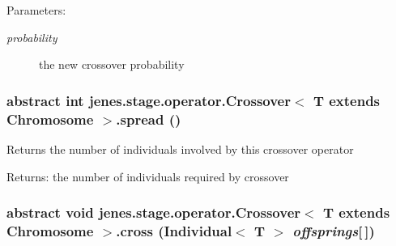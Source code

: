 \begin{Desc}
\item[Parameters:]
\begin{description}
\item[{\em probability}]the new crossover probability \end{description}
\end{Desc}
\hypertarget{classjenes_1_1stage_1_1operator_1_1_crossover_3_01_t_01extends_01_chromosome_01_4_8bb995f2cf77073b79c9276ee3e8535d}{
\subsubsection[spread]{\setlength{\rightskip}{0pt plus 5cm}abstract int jenes.stage.operator.Crossover$<$ T extends Chromosome $>$.spread ()}}
\label{classjenes_1_1stage_1_1operator_1_1_crossover_3_01_t_01extends_01_chromosome_01_4_8bb995f2cf77073b79c9276ee3e8535d}


Returns the number of individuals involved by this crossover operator 

\begin{Desc}
\item[Returns:]the number of individuals required by crossover \end{Desc}
\hypertarget{classjenes_1_1stage_1_1operator_1_1_crossover_3_01_t_01extends_01_chromosome_01_4_c47e22fb5a73617bde7a1131da5be161}{
\subsubsection[cross]{\setlength{\rightskip}{0pt plus 5cm}abstract void jenes.stage.operator.Crossover$<$ T extends Chromosome $>$.cross (Individual$<$ T $>$ {\em offsprings}\mbox{[}$\,$\mbox{]})}}
\label{classjenes_1_1stage_1_1operator_1_1_crossover_3_01_t_01extends_01_chromosome_01_4_c47e22fb5a73617bde7a1131da5be161}


